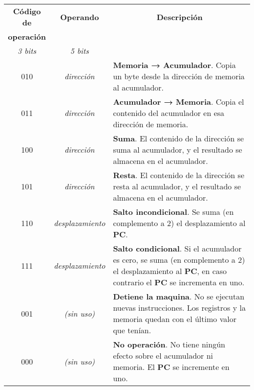 \documentclass[12pt]{article}
\begin{document}
\begin{tabularx}{\textwidth}{c|c|X}

    \textbf{Código de} & \textbf{Operando} &
    \multicolumn{1}{c}{\textbf{Descripción}} \\
    \textbf{operación} & & \\
    \emph{3 bits} & \emph{5 bits} & \\
    \hline
    \hline

    010 & \emph{dirección} & \textbf{Memoria → Acumulador}. Copia un byte
    desde la dirección de memoria al acumulador. \\
    \hline

    011 & \emph{dirección} & \textbf{Acumulador → Memoria}. Copia el contenido
    del acumulador en esa dirección de memoria. \\
    \hline

    100 & \emph{dirección} & \textbf{Suma}. El contenido de la dirección se
    suma al acumulador, y el resultado se almacena en el acumulador. \\
    \hline

    101 & \emph{dirección} & \textbf{Resta}. El contenido de la dirección se
    resta al acumulador, y el resultado se almacena en el acumulador. \\
    \hline

    110 & \emph{desplazamiento} & \textbf{Salto incondicional}. Se suma (en
    complemento a 2) el desplazamiento al \textbf{PC}. \\
    \hline

    111 & \emph{desplazamiento} & \textbf{Salto condicional}. Si el acumulador
    es cero, se suma (en complemento a 2) el desplazamiento al \textbf{PC}, en
    caso contrario el \textbf{PC} se incrementa en uno. \\
    \hline

    001 & \emph{(sin uso)} & \textbf{Detiene la maquina}. No se ejecutan
    nuevas instrucciones. Los registros y la memoria quedan con el último
    valor que tenían. \\
    \hline

    000 & \emph{(sin uso)} & \textbf{No operación}. No tiene ningún efecto
    sobre el acumulador ni memoria. El \textbf{PC} se incremente en uno. \\

\end{tabularx}
\end{document}
